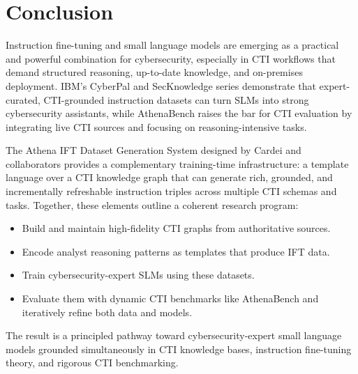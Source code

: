 \documentclass[10pt]{article}
\begin{document}
\section{Conclusion}

Instruction fine-tuning and small language models are emerging as a practical and powerful combination for cybersecurity, especially in CTI workflows that demand structured reasoning, up-to-date knowledge, and on-premises deployment. IBM’s CyberPal and SecKnowledge series demonstrate that expert-curated, CTI-grounded instruction datasets can turn SLMs into strong cybersecurity assistants, while AthenaBench raises the bar for CTI evaluation by integrating live CTI sources and focusing on reasoning-intensive tasks.\cite{levi2024cyberpal,levi2025toward,alam2025athenabench}

The Athena IFT Dataset Generation System designed by Cardei and collaborators provides a complementary training-time infrastructure: a template language over a CTI knowledge graph that can generate rich, grounded, and incrementally refreshable instruction triples across multiple CTI schemas and tasks.\cite{cardei2025ift} Together, these elements outline a coherent research program:

\begin{itemize}[leftmargin=*]
  \item Build and maintain high-fidelity CTI graphs from authoritative sources.
  \item Encode analyst reasoning patterns as templates that produce IFT data.
  \item Train cybersecurity-expert SLMs using these datasets.
  \item Evaluate them with dynamic CTI benchmarks like AthenaBench and iteratively refine both data and models.
\end{itemize}

The result is a principled pathway toward cybersecurity-expert small language models grounded simultaneously in CTI knowledge bases, instruction fine-tuning theory, and rigorous CTI benchmarking.



\end{document}
